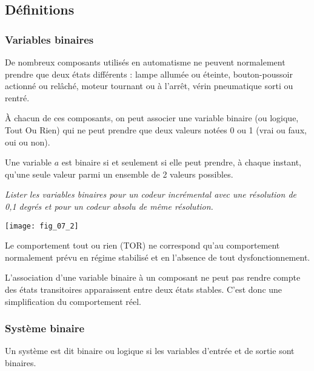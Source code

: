 \subsection{Définitions}
\subsubsection{Variables binaires}
De nombreux composants utilisés en automatisme ne peuvent normalement prendre que deux états différents : lampe allumée ou éteinte, bouton-poussoir actionné ou relâché, moteur tournant ou à l'arrêt, vérin pneumatique sorti ou rentré. 


À chacun de ces composants, on peut associer une variable binaire (ou logique, Tout Ou Rien) qui ne peut prendre que deux valeurs notées 0 ou 1 (vrai ou faux, oui ou non). 

\begin{defi}
Une variable $a$ est binaire si et seulement si elle peut prendre, à chaque instant, qu'une seule valeur parmi un ensemble de 2 valeurs possibles. 
\end{defi}

\begin{exemple}
\textit{Lister les variables binaires pour un codeur incrémental avec une résolution de 0,1 degrés et pour un codeur absolu de même résolution.}
\end{exemple}



\begin{marginfigure}
\texttt{[image: fig\_07\_2]}
\end{marginfigure}

\begin{rem}
Le comportement tout ou rien (TOR) ne correspond qu'au comportement normalement prévu en régime stabilisé et en l'absence de tout dysfonctionnement. 

L'association d'une variable binaire à un composant ne peut pas rendre compte des états transitoires apparaissent entre deux états stables. C'est donc une simplification du comportement réel.

\end{rem}



\subsubsection{Système binaire}

\begin{defi}
Un système est dit binaire ou logique si les variables d'entrée et de sortie sont binaires. 
\end{defi}

